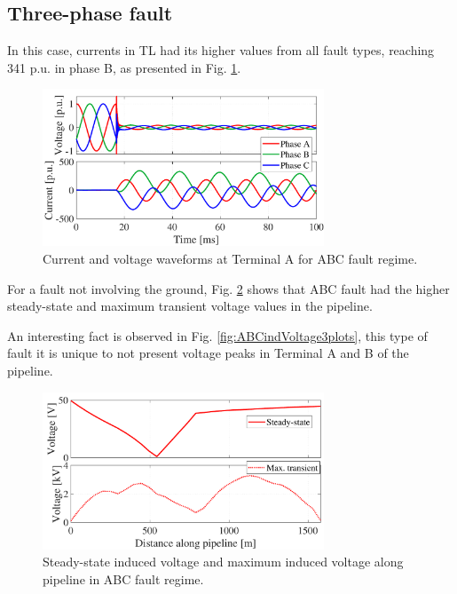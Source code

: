 \documentclass[5p,twocolumn]{elsarticle}
\begin{document}
\subsection{Three-phase fault}

In this case, currents in TL had its higher values from all fault types, reaching 341 p.u. in phase B, as presented in Fig. \ref{fig:ABCindVoltageTL}. 

\begin{figure}[h]
	\begin{center}
		\includegraphics[width=8.4cm]{img/ABCindVoltage_TL.pdf}    %
		\caption{Current and voltage waveforms at Terminal A for ABC fault regime.} 
		\label{fig:ABCindVoltageTL}
	\end{center}
\end{figure}

For a fault not involving the ground, Fig. \ref{fig:ABCindVoltage} shows that ABC fault had the higher steady-state and maximum transient voltage values in the pipeline.   

An interesting fact is observed in Fig. \ref{fig:ABCindVoltage3plots}, this type of fault it is unique to not present voltage peaks in Terminal A and B of the pipeline.  

\begin{figure}[h]
	\begin{center}
		\includegraphics[width=8.4cm]{img/ABCindVoltage.pdf}    %
		\caption{Steady-state induced voltage and maximum induced voltage along pipeline in ABC fault regime.} 
		\label{fig:ABCindVoltage}
	\end{center}
\end{figure}
\end{document}
